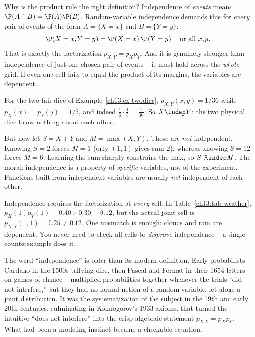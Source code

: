 \begin{whybox}
Why is the product rule the right definition? Independence of \emph{events} means
$\P(A\cap B)=\P(A)\P(B)$. Random-variable independence demands this for
\emph{every} pair of events of the form $A=\{X=x\}$ and $B=\{Y=y\}$:
\[
  \P(X=x, Y=y) = \P(X=x)\,\P(Y=y) \quad\text{for all } x,y.
\]
That is exactly the factorization $p_{X,Y}=p_X p_Y$. And it is genuinely
stronger than independence of just one chosen pair of events -- it must hold
across the \emph{whole} grid. If even one cell fails to equal the product of its
margins, the variables are dependent.
\end{whybox}

\begin{example}
\label{ch13:ex-dice-indep}
For the two fair dice of Example~\ref{ch13:ex-twodice},
$p_{X,Y}(x,y)=1/36$ while $p_X(x)=p_Y(y)=1/6$, and indeed
$\tfrac{1}{6}\cdot\tfrac{1}{6}=\tfrac{1}{36}$. So $X \indep Y$: the two physical
dice know nothing about each other.

But now let $S=X+Y$ and $M=\max(X,Y)$. These are \emph{not} independent. Knowing
$S=2$ forces $M=1$ (only $(1,1)$ gives sum $2$), whereas knowing $S=12$ forces
$M=6$. Learning the sum sharply constrains the max, so $S\not\indep M$. The
moral: independence is a property of \emph{specific} variables, not of the
experiment. Functions built from independent variables are usually \emph{not}
independent of each other.
\end{example}

\begin{trapbox}
Independence requires the factorization at \emph{every} cell. In
Table~\ref{ch13:tab-weather}, $p_X(1)p_Y(1)=0.40\times0.30=0.12$, but the actual
joint cell is $p_{X,Y}(1,1)=0.25\ne 0.12$. One mismatch is enough: clouds and
rain are dependent. You never need to check all cells to \emph{disprove}
independence -- a single counterexample does it.
\end{trapbox}

\begin{historybox}
The word ``independence'' is older than its modern definition. Early probabilists
-- Cardano in the 1500s tallying dice, then Pascal and Fermat in their 1654
letters on games of chance -- multiplied probabilities together whenever the
trials ``did not interfere,'' but they had no formal notion of a random variable,
let alone a joint distribution. It was the systematization of the subject in the
19th and early 20th centuries, culminating in Kolmogorov's 1933 axioms, that
turned the intuitive ``does not interfere'' into the crisp algebraic statement
$p_{X,Y}=p_X p_Y$. What had been a modeling instinct became a checkable equation.
\end{historybox}

